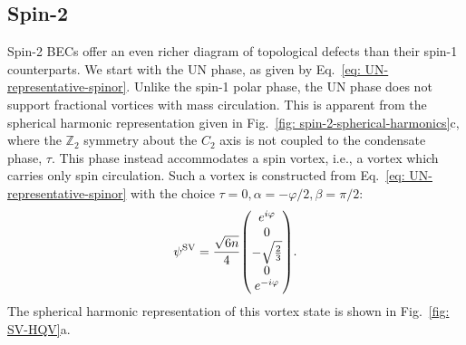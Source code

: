 \subsection{Spin-2}\label{sec: vortices-spin-2}
Spin-2 BECs offer an even richer diagram of topological defects than their
spin-1 counterparts.
We start with the UN phase, as given by
Eq.~\eqref{eq: UN-representative-spinor}.
Unlike the spin-1 polar phase, the UN phase does not support fractional vortices
with mass circulation.
This is apparent from the spherical harmonic representation given in
Fig.~\ref{fig: spin-2-spherical-harmonics}c, where the \(\mathbb{Z}_2\) symmetry
about the \(C_2\) axis is not coupled to the condensate phase, \(\tau \).
This phase instead accommodates a spin vortex, i.e., a vortex which carries only
spin circulation.
Such a vortex is constructed from Eq.~\eqref{eq: UN-representative-spinor} with
the choice \(\tau=0, \alpha=-\varphi/2, \beta=\pi/2\):
\begin{equation}
    \psi^\mathrm{SV} = \frac{\sqrt{6n}}{4}\mqty(
    e^{i\varphi} \\
    0 \\
    -\sqrt{\frac{2}{3}} \\
    0 \\ e^{-i\varphi}
    ).
\end{equation}
The spherical harmonic representation of this vortex state is shown in
Fig.~\ref{fig: SV-HQV}a.

